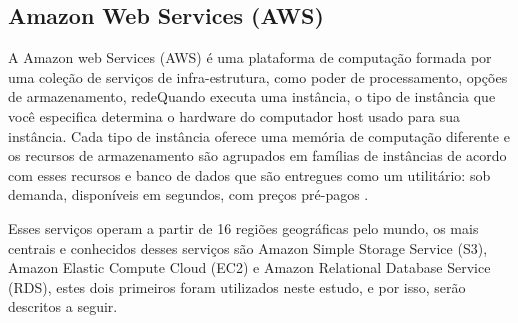 \subsection{Amazon Web Services (AWS)}

A Amazon web Services (AWS) é uma plataforma de computação formada por uma coleção de serviços de infra-estrutura, como poder de processamento, opções de armazenamento, redeQuando executa uma instância, o tipo de instância que você especifica determina o hardware do computador host usado para sua instância. Cada tipo de instância oferece uma memória de computação diferente e os recursos de armazenamento são agrupados em famílias de instâncias de acordo com esses recursos e banco de dados que são entregues como um utilitário: sob demanda, disponíveis em segundos, com preços pré-pagos \cite{awsOverview}.

Esses serviços operam a partir de 16 regiões geográficas pelo mundo, os mais centrais e conhecidos desses serviços são Amazon Simple Storage Service (S3), Amazon Elastic Compute Cloud (EC2) e Amazon Relational Database Service (RDS), estes dois primeiros foram utilizados neste estudo, e por isso, serão descritos a seguir.

